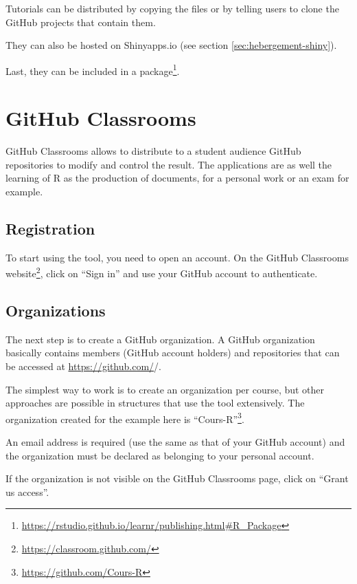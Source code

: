 \documentclass[
  12pt,
  american,
  a4paper,
  extrafontsizes,onecolumn,openright
  ]{memoir}
\begin{document}
Tutorials can be distributed by copying the files or by telling users to clone the GitHub projects that contain them.

They can also be hosted on Shinyapps.io (see section \ref{sec:hebergement-shiny}).

Last, they can be included in a package\footnote{\url{https://rstudio.github.io/learnr/publishing.html\#R_Package}}.

\hypertarget{github-classrooms}{%
\section{GitHub Classrooms}\label{github-classrooms}}

GitHub Classrooms allows to distribute to a student audience GitHub repositories to modify and control the result.
The applications are as well the learning of R as the production of documents, for a personal work or an exam for example.

\hypertarget{registration}{%
\subsection{Registration}\label{registration}}

To start using the tool, you need to open an account.
On the GitHub Classrooms website\footnote{\url{https://classroom.github.com/}}, click on \enquote{Sign in} and use your GitHub account to authenticate.

\hypertarget{organizations}{%
\subsection{Organizations}\label{organizations}}

The next step is to create a GitHub organization.
A GitHub organization basically contains members (GitHub account holders) and repositories that can be accessed at \url{https://github.com/}/.

The simplest way to work is to create an organization per course, but other approaches are possible in structures that use the tool extensively.
The organization created for the example here is \enquote{Cours-R}\footnote{\url{https://github.com/Cours-R}}.

An email address is required (use the same as that of your GitHub account) and the organization must be declared as belonging to your personal account.

If the organization is not visible on the GitHub Classrooms page, click on \enquote{Grant us access}.
\end{document}
